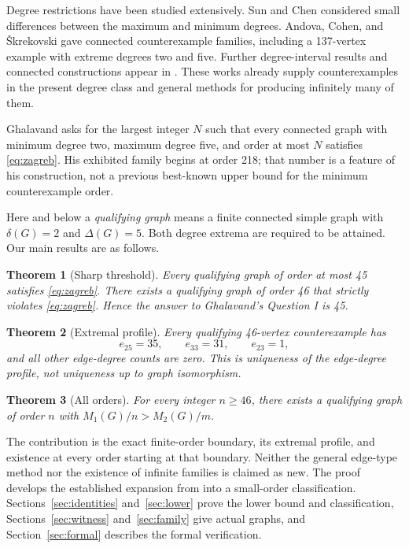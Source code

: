 \documentclass[11pt]{amsart}
\newtheorem{theorem}{Theorem}
\theoremstyle{definition}
\theoremstyle{remark}
\newcommand{\dd}{\delta}
\newcommand{\DD}{\Delta}
\begin{document}
Degree restrictions have been studied extensively. Sun and Chen \cite{SC} considered small differences between the maximum and minimum degrees. Andova, Cohen, and \v{S}krekovski \cite{ACS} gave connected counterexample families, including a 137-vertex example with extreme degrees two and five. Further degree-interval results and connected constructions appear in \cite{ABDP,VGFAD}. These works already supply counterexamples in the present degree class and general methods for producing infinitely many of them.

Ghalavand \cite[p.~451, Question I]{Ghalavand} asks for the largest integer $N$ such that every connected graph with minimum degree two, maximum degree five, and order at most $N$ satisfies \eqref{eq:zagreb}. His exhibited family begins at order 218; that number is a feature of his construction, not a previous best-known upper bound for the minimum counterexample order.

Here and below a \emph{qualifying graph} means a finite connected simple graph with $\dd(G)=2$ and $\DD(G)=5$. Both degree extrema are required to be attained. Our main results are as follows.

\begin{theorem}[Sharp threshold]\label{thm:A}
Every qualifying graph of order at most 45 satisfies \eqref{eq:zagreb}. There exists a qualifying graph of order 46 that strictly violates \eqref{eq:zagreb}. Hence the answer to Ghalavand's Question I is 45.
\end{theorem}

\begin{theorem}[Extremal profile]\label{thm:B}
Every qualifying 46-vertex counterexample has
\[
 e_{25}=35,\qquad e_{33}=31,\qquad e_{23}=1,
\]
and all other edge-degree counts are zero. This is uniqueness of the edge-degree profile, not uniqueness up to graph isomorphism.
\end{theorem}

\begin{theorem}[All orders]\label{thm:C}
For every integer $n\ge46$, there exists a qualifying graph of order $n$ with $M_1(G)/n>M_2(G)/m$.
\end{theorem}

The contribution is the exact finite-order boundary, its extremal profile, and existence at every order starting at that boundary. Neither the general edge-type method nor the existence of infinite families is claimed as new. The proof develops the established expansion from \cite{HV,ACS,ABDP} into a small-order classification. Sections~\ref{sec:identities} and~\ref{sec:lower} prove the lower bound and classification, Sections~\ref{sec:witness} and~\ref{sec:family} give actual graphs, and Section~\ref{sec:formal} describes the formal verification.
\end{document}
